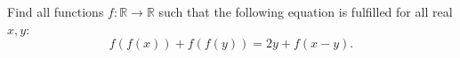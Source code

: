 Find all functions $f\colon \mathbb{R} \to \mathbb{R}$ such that the following equation
is fulfilled for all real $x,y$:
$$f(f(x))+f(f(y))=2y+f(x-y).$$